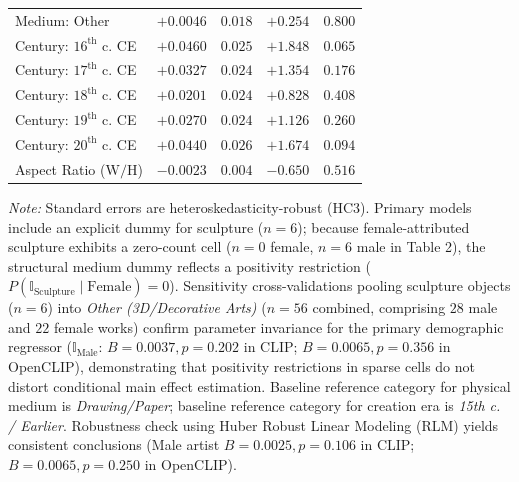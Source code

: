 \documentclass[pdflatex,sn-mathphys-num]{sn-jnl}%
\theoremstyle{thmstyleone}%
\theoremstyle{thmstyletwo}%
\theoremstyle{thmstylethree}%
\begin{document}
\begin{table}[h]
\begin{tabular}{lrrrr}
Medium: Other & $+0.0046$ & $0.018$ & $+0.254$ & $0.800$ \\
Century: $16^{\text{th}}$ c. CE & $+0.0460$ & $0.025$ & $+1.848$ & $0.065$ \\
Century: $17^{\text{th}}$ c. CE & $+0.0327$ & $0.024$ & $+1.354$ & $0.176$ \\
Century: $18^{\text{th}}$ c. CE & $+0.0201$ & $0.024$ & $+0.828$ & $0.408$ \\
Century: $19^{\text{th}}$ c. CE & $+0.0270$ & $0.024$ & $+1.126$ & $0.260$ \\
Century: $20^{\text{th}}$ c. CE & $+0.0440$ & $0.026$ & $+1.674$ & $0.094$ \\
Aspect Ratio ($\text{W}/\text{H}$) & $-0.0023$ & $0.004$ & $-0.650$ & $0.516$ \\
\bottomrule
\end{tabular}
\begin{minipage}{\linewidth}
\vspace{0.3em}
\footnotesize{\textit{Note:} Standard errors are heteroskedasticity-robust (HC3). Primary models include an explicit dummy for sculpture ($n=6$); because female-attributed sculpture exhibits a zero-count cell ($n=0$ female, $n=6$ male in Table 2), the structural medium dummy reflects a positivity restriction ($P(\mathbb{I}_{\text{Sculpture}} \mid \text{Female}) = 0$). Sensitivity cross-validations pooling sculpture objects ($n=6$) into \textit{Other (3D/Decorative Arts)} ($n=56$ combined, comprising $28$ male and $22$ female works) confirm parameter invariance for the primary demographic regressor ($\mathbb{I}_{\text{Male}}$: $B = 0.0037, p = 0.202$ in CLIP; $B = 0.0065, p = 0.356$ in OpenCLIP), demonstrating that positivity restrictions in sparse cells do not distort conditional main effect estimation. Baseline reference category for physical medium is \textit{Drawing/Paper}; baseline reference category for creation era is \textit{15th c. / Earlier}. Robustness check using Huber Robust Linear Modeling (RLM) yields consistent conclusions (Male artist $B = 0.0025, p = 0.106$ in CLIP; $B = 0.0065, p = 0.250$ in OpenCLIP).}
\end{minipage}
\end{table}
\end{document}
